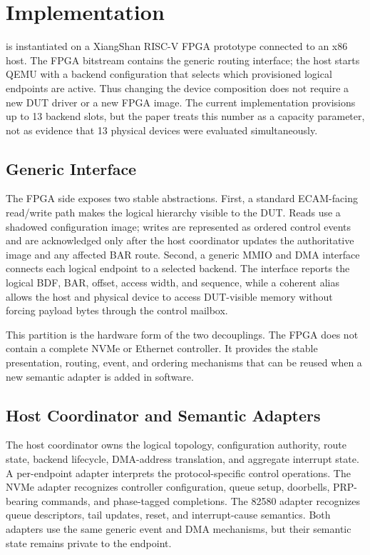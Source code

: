 \section{Implementation}
\label{sec:implementation}

\sys is instantiated on a XiangShan RISC-V FPGA prototype connected to an
x86 host. The FPGA bitstream contains the generic routing interface; the host
starts QEMU with a backend configuration that selects which provisioned logical
endpoints are active. Thus changing the device composition does not require a
new DUT driver or a new FPGA image. The current implementation provisions up to
13 backend slots, but the paper treats this number as a capacity parameter, not
as evidence that 13 physical devices were evaluated simultaneously.

\subsection{Generic Interface}

The FPGA side exposes two stable abstractions. First, a standard ECAM-facing
read/write path makes the logical hierarchy visible to the DUT. Reads use a
shadowed configuration image; writes are represented as ordered control events
and are acknowledged only after the host coordinator updates the authoritative
image and any affected BAR route. Second, a generic MMIO and DMA interface
connects each logical endpoint to a selected backend. The interface reports the
logical BDF, BAR, offset, access width, and sequence, while a coherent alias
allows the host and physical device to access DUT-visible memory without
forcing payload bytes through the control mailbox.

This partition is the hardware form of the two decouplings. The FPGA does not
contain a complete NVMe or Ethernet controller. It provides the stable
presentation, routing, event, and ordering mechanisms that can be reused when a
new semantic adapter is added in software.

\subsection{Host Coordinator and Semantic Adapters}

The host coordinator owns the logical topology, configuration authority, route
state, backend lifecycle, DMA-address translation, and aggregate interrupt
state. A per-endpoint adapter interprets the protocol-specific control
operations. The NVMe adapter recognizes controller configuration, queue setup,
doorbells, PRP-bearing commands, and phase-tagged completions. The 82580
adapter recognizes queue descriptors, tail updates, reset, and interrupt-cause
semantics. Both adapters use the same generic event and DMA mechanisms, but
their semantic state remains private to the endpoint.

